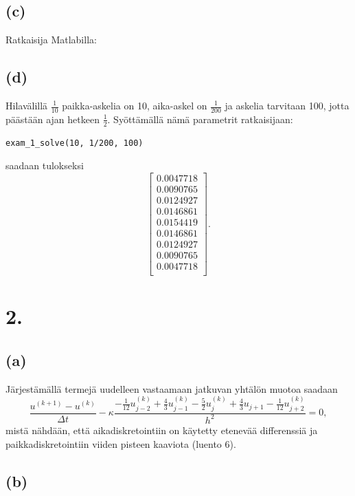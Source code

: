\documentclass{article}
\begin{document}
\subsection*{(c)}

Ratkaisija Matlabilla:



\subsection*{(d)}

Hilavälillä $\frac{1}{10}$ paikka-askelia on 10, aika-askel on $\frac{1}{200}$
ja askelia tarvitaan 100, jotta päästään ajan hetkeen $\frac{1}{2}$.
Syöttämällä nämä parametrit ratkaisijaan:

\begin{verbatim}
exam_1_solve(10, 1/200, 100)
\end{verbatim}

saadaan tulokseksi
\[
  \begin{bmatrix}
   0.0047718 \\
   0.0090765 \\
   0.0124927 \\
   0.0146861 \\
   0.0154419 \\
   0.0146861 \\
   0.0124927 \\
   0.0090765 \\
   0.0047718 \\
  \end{bmatrix}.
\]

\newpage
\section*{2.}

\subsection*{(a)}

Järjestämällä termejä uudelleen vastaamaan jatkuvan yhtälön muotoa saadaan
\[
  \frac{u^{(k+1)} - u^{(k)}}{\Delta t}
  - \kappa \frac{-\frac{1}{12}u_{j-2}^{(k)} + \frac{4}{3}u_{j-1}^{(k)}
  - \frac{5}{2}u_j^{(k)} + \frac{4}{3}u_{j+1} - \frac{1}{12}u_{j+2}^{(k)}}{h^2} = 0,
\]
mistä nähdään, että aikadiskretointiin on käytetty etenevää differenssiä ja
paikkadiskretointiin vii\-den pisteen kaaviota (luento 6).

\subsection*{(b)}
\end{document}
